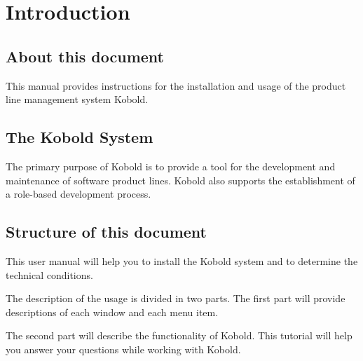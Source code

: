 \chapter{Introduction}

\section{About this document}

This manual provides instructions for the installation and usage of the
product line management system Kobold.

\section{The Kobold System}

The primary purpose of Kobold is to provide a tool for the development
and maintenance of software product lines. Kobold also supports the
establishment of a role-based development process.

\section{Structure of this document}
This user manual will help you to install the Kobold system and to
determine the technical conditions. \par
The description of the usage is divided in two parts. The first part
will provide descriptions of each window and
each menu item. 
\par
The second part will describe the functionality of Kobold. This tutorial
will help you answer your questions while working with Kobold.